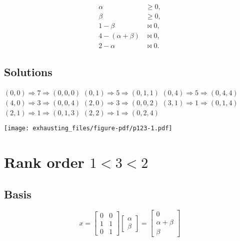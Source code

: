 \documentclass[
  12pt,
  letterpaper,
  DIV=11,
  numbers=noendperiod]{scrartcl}
\begin{document}
\begin{align}
\alpha&\geq 0,\\
\beta&\geq 0,\\
1-\beta&\bowtie 0,\\
4-(\alpha+\beta)&\bowtie 0,\\
2-\alpha&\bowtie 0.
\end{align}

\subsection{Solutions}\label{solutions}

\((0,0)\Rightarrow 7\Rightarrow(0,0,0)\)\newline
\((0,1)\Rightarrow 5\Rightarrow(0,1,1)\)\newline
\((0,4)\Rightarrow 5\Rightarrow(0,4,4)\)\newline
\((4,0)\Rightarrow 3\Rightarrow(0,0,4)\)\newline
\((2,0)\Rightarrow 3\Rightarrow(0,0,2)\)\newline
\((3,1)\Rightarrow 1\Rightarrow(0,1,4)\)\newline
\((2,1)\Rightarrow 1\Rightarrow(0,1,3)\)\newline
\((2,2)\Rightarrow 1\Rightarrow(0,2,4)\)\newline

\begin{center}
\texttt{[image: exhausting\_files/figure-pdf/p123-1.pdf]}
\end{center}

\pagebreak

\section{\texorpdfstring{Rank order
\(1<3<2\)}{Rank order 1\textless3\textless2}}\label{rank-order-132}

\subsection{Basis}\label{basis-1}

\[
x=
\begin{bmatrix}
0&0\\
1&1\\
0&1
\end{bmatrix}
\begin{bmatrix}
\alpha\\
\beta
\end{bmatrix}=
\begin{bmatrix}
0\\
\alpha+\beta\\
\beta
\end{bmatrix}
\]
\end{document}
